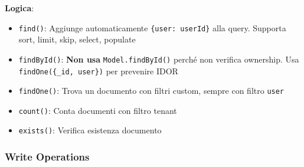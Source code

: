\documentclass[11pt,a4paper]{article}
\begin{document}
\textbf{Logica}:
\begin{itemize}
    \item \texttt{find()}: Aggiunge automaticamente \texttt{\{user: userId\}} alla query. Supporta sort, limit, skip, select, populate
    \item \texttt{findById()}: \textbf{Non usa} \texttt{Model.findById()} perché non verifica ownership. Usa \texttt{findOne(\{_id, user\})} per prevenire IDOR
    \item \texttt{findOne()}: Trova un documento con filtri custom, sempre con filtro \texttt{user}
    \item \texttt{count()}: Conta documenti con filtro tenant
    \item \texttt{exists()}: Verifica esistenza documento
\end{itemize}

\subsubsection{Write Operations}
\end{document}
